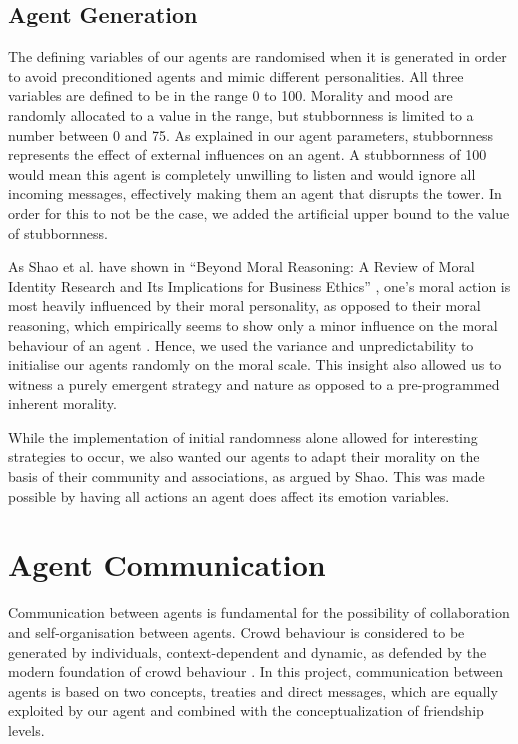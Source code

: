 \subsection{Agent Generation}
The defining variables of our agents are randomised when it is generated in order to avoid preconditioned agents and mimic different personalities. All three variables are defined to be in the range 0 to 100. Morality and mood are randomly allocated to a value in the range, but stubbornness is limited to a number between 0 and 75. As explained in our agent parameters, stubbornness represents the effect of external influences on an agent. A stubbornness of 100 would mean this agent is completely unwilling to listen and would ignore all incoming messages, effectively making them an agent that disrupts the tower. In order for this to not be the case, we added the artificial upper bound to the value of stubbornness.\par 
As Shao et al. have shown in “Beyond Moral Reasoning: A Review of Moral Identity Research and Its Implications for Business Ethics” \cite{shao_aquino_freeman_2008}, one’s moral action is most heavily influenced by their moral personality, as opposed to their moral reasoning, which empirically seems to show only a minor influence on the moral behaviour of an agent \cite{blasi_1983}. Hence, we used the variance and unpredictability to initialise our agents randomly on the moral scale. This insight also allowed us to witness a purely emergent strategy and nature as opposed to a pre-programmed inherent morality.\par 
While the implementation of initial randomness alone allowed for interesting strategies to occur, we also wanted our agents to adapt their morality on the basis of their community and associations, as argued by Shao. This was made possible by having all actions an agent does affect its emotion variables. \par 

\section{Agent Communication}\label{sec:agent_communication}
Communication between agents is fundamental for the possibility of collaboration and self-organisation between agents. Crowd behaviour is considered to be generated by individuals, context-dependent and dynamic, as defended by the modern foundation of crowd behaviour \cite{0d9bc1ee81234780b2bb6ecd02762d56}. In this project, communication between agents is based on two concepts, treaties and direct messages, which are equally exploited by our agent and combined with the conceptualization of friendship levels. 

